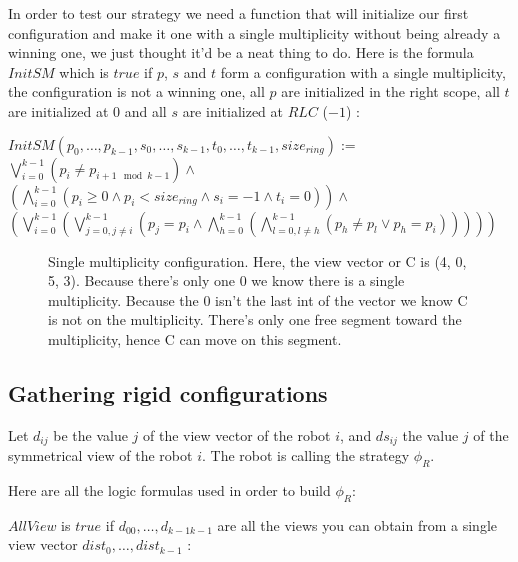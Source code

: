 \documentclass{article}
\begin{document}
In order to test our strategy we need a function that will initialize our first configuration and make it one with a single multiplicity without being already a winning one, we just thought it'd be a neat thing to do. Here is the formula $InitSM$ which is $true$ if $p$, $s$ and $t$ form a configuration with a single multiplicity, the configuration is not a winning one, all $p$ are initialized in the right scope, all $t$ are initialized at $0$ and all $s$ are initialized at $RLC$ ($-1$) :

\begin{center}
    
$InitSM(p_{0},\dots, p_{k-1}, s_{0}, \dots, s_{k-1}, t_{0}, \dots, t_{k-1}, size_{ring}):=$\\
$\bigvee_{i = 0}^{k-1}( p_{i} \not= p_{i+1 \mod{k-1}} ) \land$\\
$(\bigwedge_{i = 0}^{k-1} ( p_{i} \geq 0 \land p_{i} <  size_{ring} \land s_{i} = -1 \land t_{i} = 0)) \land$\\
$(\bigvee_{i = 0}^{k-1} (\bigvee_{j = 0, j\not=i}^{k-1} (p_{j} = p_{i} \land \bigwedge_{h = 0}^{k-1} ( \bigwedge_{l = 0, l\not=h}^{k-1} (p_{h} \not= p_{l} \lor p_{h} = p_{i}) ) ) ) )$
\end{center}

\begin{figure}
    \centering
    \def\svgscale{0.3}
    
    \caption{Single multiplicity configuration. Here, the view vector or C is (4, 0, 5, 3). Because there's only one 0 we know there is a single multiplicity. Because the 0 isn't the last int of the vector we know C is not on the multiplicity. There's only one free segment toward the multiplicity, hence C can move on this segment.}
    \label{dessinSM}
\end{figure}

\subsection{Gathering rigid configurations}

Let $d_{ij}$ be the value $j$ of the view vector of the robot $i$, and $ds_{ij}$ the value $j$ of the symmetrical 
view of the robot $i$.
The robot is calling the strategy $\phi_R$.

Here are all the logic formulas used in order to build $\phi_R$:\newline


$AllView$ is $true$ if $d_{00}, \ldots ,d_{k-1k-1}$ are all the views you can obtain from a single view vector $dist_{0}, \ldots ,dist_{k-1}$ :
\end{document}
